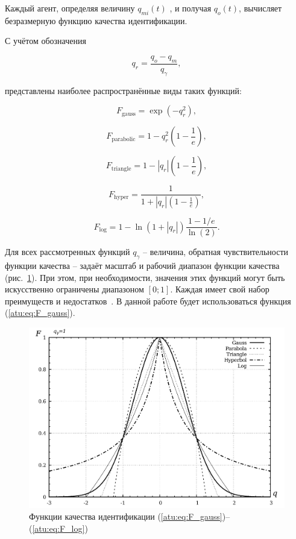 \documentclass[a4paper,paratype,12pt,fouriernc]{cmonogra}
\begin{document}
Каждый агент, определяя величину $q_{mi}(t)$ , и получая $q_o(t)$,
вычисляет безразмерную функцию качества идентификации.

С учётом обозначения

\[
  q_r = \frac{q_o - q_m}{q_\gamma},
\]

\noindent
представлены наиболее распространённые виды таких функций:

\begin{equation}
  F_{\mathrm{gauss}} = \exp( - q_r^2 ),
\label{atu:eq:F_gauss}
\end{equation}

\begin{equation}
  F_{\mathrm{parabolic}} = 1 - q_r^2 \left( 1 - \frac{1}{e} \right),
\label{atu:eq:F_parabolic}
\end{equation}

\begin{equation}
  F_{\mathrm{triangle}} = 1 - |q_r| \left( 1 - \frac{1}{e} \right),
\label{atu:eq:F_triangle}
\end{equation}

\begin{equation}
  F_{\mathrm{hyper}} = \frac{1}{ 1 + |q_r| \left( 1 - \frac{1}{e} \right)},
\label{atu:eq:F_hyper}
\end{equation}

\begin{equation}
  F_{\mathrm{log}} = 1 - \ln \left( 1 + |q_r| \right) \frac{1-1/e}{\ln(2)}.
\label{atu:eq:F_log}
\end{equation}

Для всех рассмотренных функций $q_\gamma$ -- величина, обратная чувствительности
функции качества -- задаёт масштаб и рабочий диапазон функции качества (рис.~\ref{atu:f:F_types}).
При этом, при необходимости, значения этих функций могут быть искусственно ограничены диапазоном $[0;1]$.
Каждая имеет свой набор преимуществ и недостатков~\cite{atu_ISDMCI2016}. В данной работе будет использоваться
функция (\ref{atu:eq:F_gauss}).

\begin{figure}[htb!]
  \centerline{\includegraphics[width=45\TW]{p/F_types.png} }
  \caption{Функции качества идентификации (\ref{atu:eq:F_gauss})--(\ref{atu:eq:F_log})}
  \label{atu:f:F_types}
\end{figure}
\end{document}
